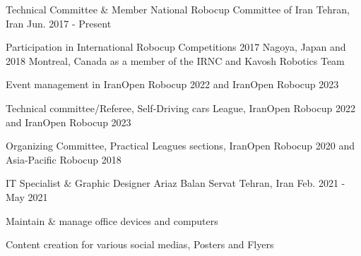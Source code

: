 


\begin{cventries}


\cventry
{Technical Committee \& Member} %
{National Robocup Committee of Iran} %
{Tehran, Iran} %
{Jun. 2017 - Present} %
{ %
\begin{cvitems}
\item {\vspace{-4.0mm}\fontsize{10}{11}\selectfont Participation in International Robocup Competitions 2017 Nagoya, Japan and 2018 Montreal, Canada as a member of the IRNC and Kavosh Robotics Team}
\item {\fontsize{10}{11}\selectfont Event management in IranOpen Robocup 2022 and IranOpen Robocup 2023}
\item {\fontsize{10}{11}\selectfont Technical committee/Referee, Self-Driving cars League, IranOpen Robocup 2022 and IranOpen Robocup 2023}
\item {\fontsize{10}{11}\selectfont Organizing Committee, Practical Leagues sections, IranOpen Robocup 2020 and Asia-Pacific Robocup 2018}
\end{cvitems}
}


\cventry
{IT Specialist \& Graphic Designer} %
{Ariaz Balan Servat} %
{Tehran, Iran} %
{Feb. 2021 - May 2021} %
{ %
\begin{cvitems}
\item {\vspace{-4.0mm}\fontsize{10}{11}\selectfont Maintain \& manage office devices and computers}
\item {\fontsize{10}{11}\selectfont Content creation for various social medias, Posters and Flyers}
\end{cvitems}
}


\end{cventries}
